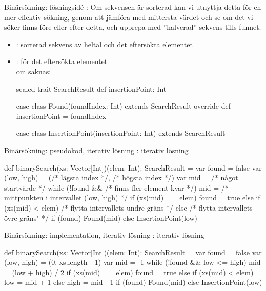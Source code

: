 \begin{Slide}{Binärsökning: lösningsidé}
: Om sekvensen är sorterad kan vi utnyttja detta för en mer effektiv sökning, genom att jämföra med mittersta värdet och se om det vi söker finns före eller efter detta, och upprepa med ''halverad'' sekvens tills funnet.
\pause
\begin{itemize}\SlideFontSmall
\item {}: sorterad sekvens av heltal och det eftersökta elementet
\item {}:  för det eftersökta elementet
\\ om saknas: 
\pause
\begin{Code}
sealed trait SearchResult {
  def insertionPoint: Int
}

case class Found(foundIndex: Int) extends SearchResult {
  override def insertionPoint = foundIndex
}
  
case class InsertionPoint(insertionPoint: Int) extends SearchResult
\end{Code}
\end{itemize} 
\end{Slide}

\begin{Slide}{Binärsökning: pseudokod, iterativ lösning}
: iterativ lösning
\begin{Code}
def binarySearch(xs: Vector[Int])(elem: Int): SearchResult = {
  var found = false
  var (low, high) = (/* lägsta index */, /* högsta index */)
  var mid = /* något startvärde */ 
  while (!found && /* finns fler element kvar */) {
    mid = /* mittpunkten i intervallet (low, high) */
    if (xs(mid) == elem) found = true
    else if (xs(mid) < elem) /* flytta intervallets undre gräns */
    else /* flytta intervallets övre gräns" */
  }
  if (found) Found(mid)
  else InsertionPoint(low)
}
\end{Code}
\end{Slide}



\begin{Slide}{Binärsökning: implementation, iterativ lösning}
: iterativ lösning
\begin{Code}
def binarySearch(xs: Vector[Int])(elem: Int): SearchResult = {
  var found = false
  var (low, high) = (0, xs.length - 1)
  var mid = -1 
  while (!found && low <= high) {
    mid = (low + high) / 2
    if (xs(mid) == elem) found = true
    else if (xs(mid) < elem) low = mid + 1
    else high = mid - 1 
  }
  if (found) Found(mid) 
  else InsertionPoint(low)
}
\end{Code}
\end{Slide}

